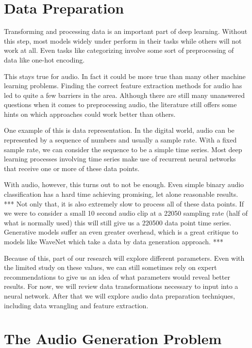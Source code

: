 \documentclass{book}
\begin{document}
\chapter{Data Preparation}
Transforming and processing data is an important part of deep learning.
Without this step, most models widely under perform in their tasks while others will not work at all.
Even tasks like categorizing involve some sort of preprocessing of data like one-hot encoding.
\par
This stays true for audio.
In fact it could be more true than many other machine learning problems.
Finding the correct feature extraction methods for audio has led to quite a few barriers in the area.
Although there are still many unanswered questions when it comes to preprocessing audio, the literature still offers some hints on which approaches could work better than others.
\par
One example of this is data representation.
In the digital world, audio can be represented by a sequence of numbers and usually a sample rate.
With a fixed sample rate, we can consider the sequence to be a simple time series.
Most deep learning processes involving time series make use of recurrent neural networks that receive one or more of these data points.
\par
With audio, however, this turns out to not be enough.
Even simple binary audio classification has a hard time achieving promising, let alone reasonable results. *** %
Not only that, it is also extremely slow to process all of these data points.
If we were to consider a small 10 second audio clip at a 22050 sampling rate (half of what is normally used) this will still give us a 220500 data point time series.
Generative models suffer an even greater overhead, which is a great critique to models like WaveNet which take a data by data generation approach. *** %
\par
Because of this, part of our research will explore different parameters.
Even with the limited study on these values, we can still sometimes rely on expert recommendations to give us an idea of what parameters would reveal better results.
For now, we will review data transformations necessary to input into a neural network.
After that we will explore audio data preparation techniques, including data wrangling and feature extraction.
\chapter{The Audio Generation Problem}
\end{document}
